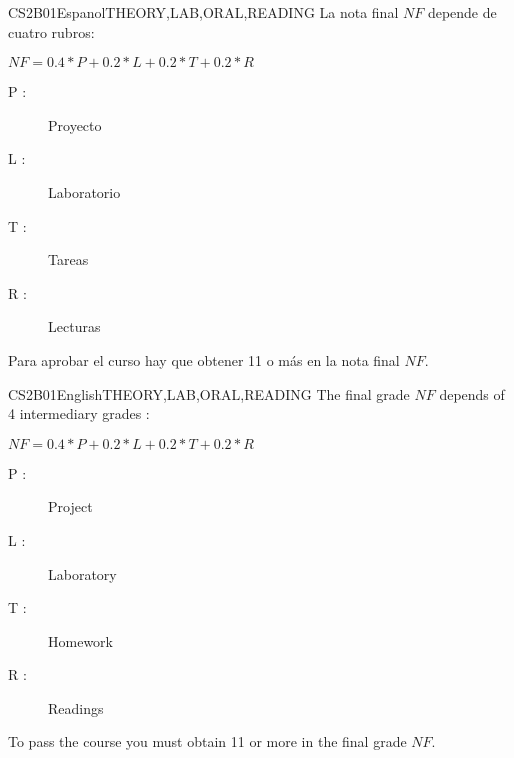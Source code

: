 \begin{evaluation}{CS2B01}{Espanol}{THEORY,LAB,ORAL,READING}
La nota final $NF$ depende de cuatro rubros:

  $ NF = 0.4*P + 0.2*L + 0.2*T + 0.2*R $

  \begin{description}
		\item[P :] Proyecto
		\item[L :] Laboratorio
    \item[T :] Tareas
    \item[R :] Lecturas
	\end{description}

	Para aprobar el curso hay que obtener 11 o más en la nota final $NF$.
\end{evaluation}

\begin{evaluation}{CS2B01}{English}{THEORY,LAB,ORAL,READING}
The final grade $NF$ depends of 4 intermediary grades :

  $ NF = 0.4*P + 0.2*L + 0.2*T + 0.2*R $

  \begin{description}
		\item[P :] Project
		\item[L :] Laboratory
    \item[T :] Homework
    \item[R :] Readings
	\end{description}

	To pass the course you must obtain 11 or more in the final grade $NF$.
\end{evaluation}
